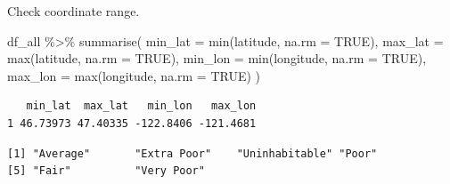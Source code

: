 \documentclass[
  english,
  letterpaper,
  DIV=11,
  numbers=noendperiod]{scrreprt}
\newenvironment{Shaded}{\begin{snugshade}}{\end{snugshade}}
\newcommand{\AttributeTok}[1]{\textcolor[rgb]{0.40,0.45,0.13}{#1}}
\newcommand{\ConstantTok}[1]{\textcolor[rgb]{0.56,0.35,0.01}{#1}}
\newcommand{\FunctionTok}[1]{\textcolor[rgb]{0.28,0.35,0.67}{#1}}
\newcommand{\NormalTok}[1]{\textcolor[rgb]{0.00,0.23,0.31}{#1}}
\newcommand{\OtherTok}[1]{\textcolor[rgb]{0.00,0.23,0.31}{#1}}
\newcommand{\SpecialCharTok}[1]{\textcolor[rgb]{0.37,0.37,0.37}{#1}}
\newcommand{\StringTok}[1]{\textcolor[rgb]{0.13,0.47,0.30}{#1}}
\begin{document}
Check coordinate range.

\begin{Shaded}
\begin{Highlighting}[]
\NormalTok{df\_all }\SpecialCharTok{\%\textgreater{}\%}
  \FunctionTok{summarise}\NormalTok{(}
    \AttributeTok{min\_lat =} \FunctionTok{min}\NormalTok{(latitude, }\AttributeTok{na.rm =} \ConstantTok{TRUE}\NormalTok{),}
    \AttributeTok{max\_lat =} \FunctionTok{max}\NormalTok{(latitude, }\AttributeTok{na.rm =} \ConstantTok{TRUE}\NormalTok{),}
    \AttributeTok{min\_lon =} \FunctionTok{min}\NormalTok{(longitude, }\AttributeTok{na.rm =} \ConstantTok{TRUE}\NormalTok{),}
    \AttributeTok{max\_lon =} \FunctionTok{max}\NormalTok{(longitude, }\AttributeTok{na.rm =} \ConstantTok{TRUE}\NormalTok{)}
\NormalTok{  )}
\end{Highlighting}
\end{Shaded}

\begin{verbatim}
   min_lat  max_lat   min_lon   max_lon
1 46.73973 47.40335 -122.8406 -121.4681
\end{verbatim}

\begin{Shaded}
\end{Shaded}

\begin{verbatim}
[1] "Average"       "Extra Poor"    "Uninhabitable" "Poor"         
[5] "Fair"          "Very Poor"    
\end{verbatim}

\begin{Shaded}
\end{Shaded}
\end{document}
